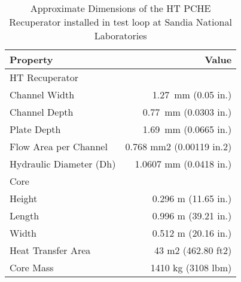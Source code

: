 \begin{table}
\label{tab:Approximate}
\caption{Approximate Dimensions of the HT PCHE Recuperator installed in test loop at Sandia National Laboratories \cite{Pasch2012}}
\begin{center}
\begin{tabulary}{0.9\textwidth}{LR}
\toprule
Property 	&	Value	\\
\midrule
HT Recuperator	&		\\
Channel Width 	&	1.27~mm (0.05 in.)	\\
Channel Depth 	&	0.77~mm (0.0303 in.)	\\
Plate Depth	&	 1.69~mm (0.0665 in.)	\\
Flow Area per Channel 	&	0.768 mm2 (0.00119 in.2)	\\
Hydraulic Diameter (Dh) 	&	1.0607 mm (0.0418 in.)	\\
Core	&		\\
Height 	&	0.296 m (11.65 in.)	\\
Length 	&	0.996 m (39.21 in.)	\\
Width 	&	0.512 m (20.16 in.)	\\
Heat Transfer Area 	&	43 m2 (462.80 ft2)	\\
Core Mass	&	 1410 kg (3108 lbm)	\\

\bottomrule
\end{tabulary}
\end{center}
\end{table}